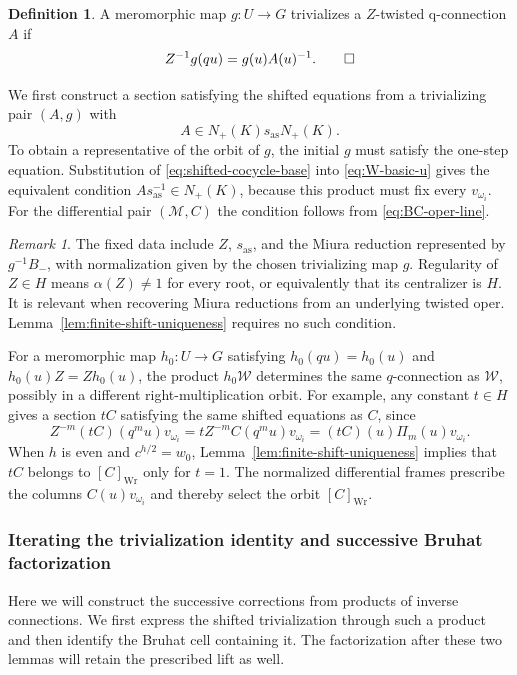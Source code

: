 \documentclass[11pt,leqno]{amsart}
\numberwithin{equation}{section}
\theoremstyle{plain}
\theoremstyle{definition}
\newtheorem{definition}[theorem]{Definition}
\theoremstyle{plain}
\theoremstyle{definition}
\theoremstyle{remark}
\newtheorem{remark}[theorem]{Remark}
\begin{document}
\begin{definition}\label{def:qconnection-trivialization}
A meromorphic map $g:U\to G$ trivializes a $Z$-twisted q-connection $A$ if
\begin{equation}\label{eq:shifted-cocycle-base}
 Z^{-1}g(qu)=g(u)A(u)^{-1}.
\qedhere
\end{equation}
\end{definition}

We first construct a section satisfying the shifted equations from a trivializing pair $(A,g)$ with
\[
 A\in N_+(K)s_{\mathrm{as}}N_+(K).
\]
To obtain a representative of the orbit of $g$, the initial $g$ must satisfy the one-step equation.  Substitution of \eqref{eq:shifted-cocycle-base} into \eqref{eq:W-basic-u} gives the equivalent condition $As_{\mathrm{as}}^{-1}\in N_+(K)$, because this product must fix every $v_{\omega_i}$.  For the differential pair $(\mathscr M,C)$ the condition follows from \eqref{eq:BC-oper-line}.

\begin{remark}\label{rem:twist-regularity}\label{rem:universal-framing}
The fixed data include $Z$, $s_{\mathrm{as}}$, and the Miura reduction represented by $g^{-1}B_-$, with normalization given by the chosen trivializing map $g$.  Regularity of $Z\in H$ means $\alpha(Z)\ne1$ for every root, or equivalently that its centralizer is $H$.  It is relevant when recovering Miura reductions from an underlying twisted oper.  Lemma~\ref{lem:finite-shift-uniqueness} requires no such condition.

For a meromorphic map $h_0:U\to G$ satisfying $h_0(qu)=h_0(u)$ and $h_0(u)Z=Zh_0(u)$, the product $h_0\mathscr W$ determines the same $q$-connection as $\mathscr W$, possibly in a different right-multiplication orbit. For example, any constant $t\in H$ gives a section $tC$ satisfying the same shifted equations as $C$, since
\[
 Z^{-m}(tC)(q^mu)v_{\omega_i}
 =tZ^{-m}C(q^mu)v_{\omega_i}
 =(tC)(u)\Pi_m(u)v_{\omega_i}.
\]
When $h$ is even and $c^{h/2}=w_0$, Lemma~\ref{lem:finite-shift-uniqueness} implies that $tC$ belongs to $[C]_{\mathrm{Wr}}$ only for $t=1$. The normalized differential frames prescribe the columns $C(u)v_{\omega_i}$ and thereby select the orbit $[C]_{\mathrm{Wr}}$.
\end{remark}

\subsubsection{Iterating the trivialization identity and successive Bruhat factorization}
Here we will construct the successive corrections from products of inverse connections.  We first express the shifted trivialization through such a product and then identify the Bruhat cell containing it.  The factorization after these two lemmas will retain the prescribed lift as well.
\end{document}
